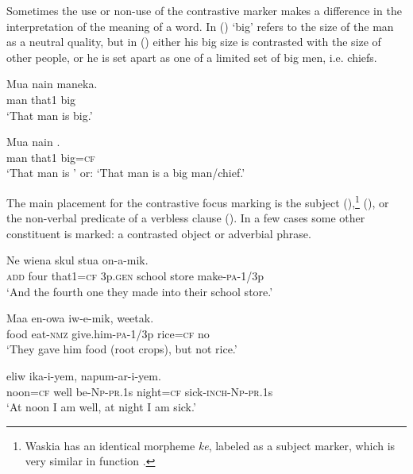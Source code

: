 Sometimes the use or non-use of the contrastive marker makes a difference in the interpretation of the meaning of a word. In ()  `big' refers to the size of the man as a neutral quality, but in () either his big size is contrasted with the size of other people, or he is set apart as one of a limited set of big men, i.e. chiefs. 

\ea%
\label{ex:x1690}
\gll Mua  nain  maneka. \\
man  that1  big      \\
\glt`That man is big.'
\z


\ea%
\label{ex:x1691}
\gll Mua  nain  . \\
man  that1  big=\textsc{cf}      \\
\glt`That man is \textsc{'} or: `That man is a big man/chief.'
\z


The main placement for the contrastive focus marking is the subject (),\footnote{Waskia has an identical morpheme \textit{ke}, labeled as a subject marker, which is very similar in function \citep[36]{RossEtAl1978}%
.} (), or the non-verbal predicate of a verbless clause (). In a few cases some other constituent is marked: a contrasted object or adverbial phrase.

\ea%
\label{ex:x1692}
\gll Ne     wiena  skul  stua  on-a-mik.\\
\textsc{add}  four  that1=\textsc{cf}  3p.\textsc{gen}  school  store  make-\textsc{pa}-1/3p\\
\glt`And the fourth one they made into their school store.'
\z


\ea%
\label{ex:x1697}
\gll Maa  en-owa  iw-e-mik,   weetak. \\
food  eat-\textsc{nmz}  give.him-\textsc{pa}-1/3p  rice=\textsc{cf}  no     \\
\glt`They gave him food (root crops), but not rice.'
\z


\ea%
\label{ex:x1693}
\gll {}  eliw  ika-i-yem,    napum-ar-i-yem. \\
noon=\textsc{cf}  well  be-\textsc{Np}-\textsc{pr}.1s  night=\textsc{cf}  sick-\textsc{inch}-\textsc{Np}-\textsc{pr}.1s      \\
\glt`At noon I am well, at night I am sick.'
\z


